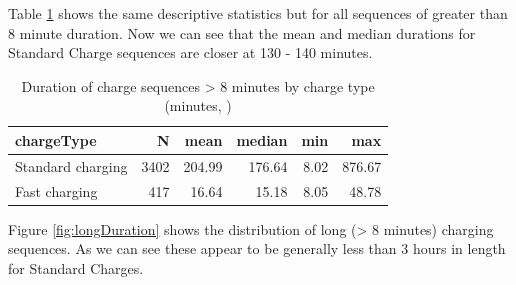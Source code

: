 \documentclass[]{article}
\newenvironment{Shaded}{\begin{snugshade}}{\end{snugshade}}
\newcommand{\KeywordTok}[1]{\textcolor[rgb]{0.13,0.29,0.53}{\textbf{#1}}}
\newcommand{\DataTypeTok}[1]{\textcolor[rgb]{0.13,0.29,0.53}{#1}}
\newcommand{\DecValTok}[1]{\textcolor[rgb]{0.00,0.00,0.81}{#1}}
\newcommand{\StringTok}[1]{\textcolor[rgb]{0.31,0.60,0.02}{#1}}
\newcommand{\OperatorTok}[1]{\textcolor[rgb]{0.81,0.36,0.00}{\textbf{#1}}}
\newcommand{\NormalTok}[1]{#1}
\begin{document}
Table \ref{tab:durationDescTableReduced} shows the same descriptive
statistics but for all sequences of greater than 8 minute duration. Now
we can see that the mean and median durations for Standard Charge
sequences are closer at 130 - 140 minutes.

\begin{Shaded}
\end{Shaded}

\begin{table}[t]

\caption{\label{tab:durationDescTableReduced}Duration of charge sequences > 8 minutes by charge type (minutes, )}
\centering
\begin{tabular}{l|r|r|r|r|r}
\hline
chargeType & N & mean & median & min & max\\
\hline
Standard charging & 3402 & 204.99 & 176.64 & 8.02 & 876.67\\
\hline
Fast charging & 417 & 16.64 & 15.18 & 8.05 & 48.78\\
\hline
\end{tabular}
\end{table}

Figure \ref{fig:longDuration} shows the distribution of long
(\textgreater{} 8 minutes) charging sequences. As we can see these
appear to be generally less than 3 hours in length for Standard Charges.
\end{document}

